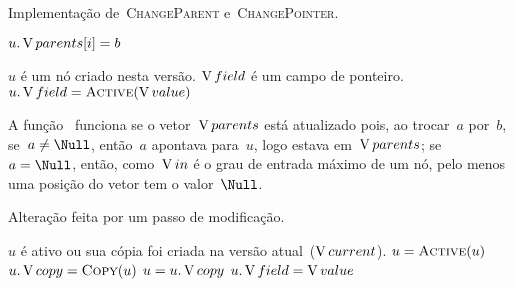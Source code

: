 \documentclass[main.tex]{subfiles}
\begin{document}
\begin{algorithm}
\caption{Implementação de~\textsc{ChangeParent} e~\textsc{ChangePointer}.} \label{lst:chng_par_ptr}
\begin{algorithmic}[1]

			\State $u.\operatorname{V}{parents}[i] = b$
			\State \Break
		\EndIf
	\EndFor
\EndFunction

\Require $u$ é um nó criado nesta versão.
\Require $\operatorname{V}{field}$ é um campo de ponteiro.
		\State {}
	\EndIf
	\State $u.\V{field} = \Call{Active}{\V{value}}$ 
		\State {}
	\EndIf
\EndFunction

\end{algorithmic}
\end{algorithm}

A função~ funciona se o vetor~$\operatorname{V}{parents}$ está atualizado pois, ao trocar~$a$ por~$b$, se~$a \neq \Null$, então~$a$ apontava para~$u$, logo estava em~$\operatorname{V}{parents}$; se~$a = \Null$, então, como~$\operatorname{V}{in}$ é o grau de entrada máximo de um nó, pelo menos uma posição do vetor tem o valor~$\Null$.

\begin{algorithm}
\caption{Alteração feita por um passo de modificação.} \label{lst:modify}
\begin{algorithmic}[1]

\Require $u$ é ativo ou sua cópia foi criada na versão atual~($\operatorname{V}{current}$).
	\State $u = \Call{Active}{u}$ \label{line:modify:active}
	 \label{line:modify:if2}
		\State $u.\cp = \Call{Copy}{u}$ \label{line:modify:copy}
		\State $u = u.\operatorname{V}{copy}$
	\EndIf
	 \label{line:modify:chngb}
		\State {}
	\Else
		\State $u.\operatorname{V}{field} = \operatorname{V}{value}$
		\EndIf \label{line:modify:chnge}
\EndFunction

\end{algorithmic}
\end{algorithm}
\end{document}
